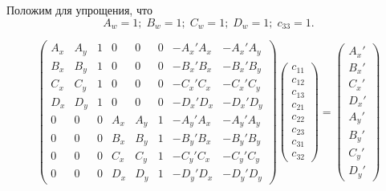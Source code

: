 Положим для упрощения, что 
$$
A_w = 1;\;
B_w = 1;\;
C_w = 1;\;
D_w = 1;\;
c_{33} = 1.
$$

\begin{equation}\label{proySys1}
	\begin{pmatrix}
		A_x & A_y & 1 & 0   & 0   & 0 & -A_x'A_x & -A_x'A_y \\
		B_x & B_y & 1 & 0   & 0   & 0 & -B_x'B_x & -B_x'B_y \\
		C_x & C_y & 1 & 0   & 0   & 0 & -C_x'C_x & -C_x'C_y \\
		D_x & D_y & 1 & 0   & 0   & 0 & -D_x'D_x & -D_x'D_y \\
		0   & 0   & 0 & A_x & A_y & 1 & -A_y'A_x & -A_y'A_y \\
		0   & 0   & 0 & B_x & B_y & 1 & -B_y'B_x & -B_y'B_y \\
		0   & 0   & 0 & C_x & C_y & 1 & -C_y'C_x & -C_y'C_y \\
		0   & 0   & 0 & D_x & D_y & 1 & -D_y'D_x & -D_y'D_y
	\end{pmatrix}
	\begin{pmatrix}
		c_{11}\\
		c_{12}\\
		c_{13}\\
		c_{21}\\
		c_{22}\\
		c_{23}\\
		c_{31}\\
		c_{32}
	\end{pmatrix}
	=
	\begin{pmatrix}
		A_x'\\
		B_x'\\
		C_x'\\
		D_x'\\
		A_y'\\
		B_y'\\
		C_y'\\
		D_y'
	\end{pmatrix}
\end{equation}